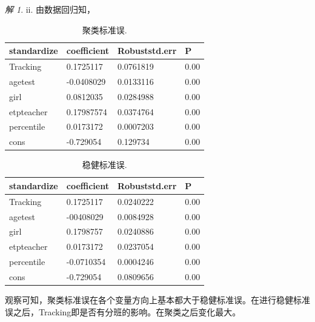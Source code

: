 \documentclass[a4paper]{ctexart}
\theoremstyle{remark}
\newtheorem*{solution}{解}
\begin{document}
\begin{itemize}
\begin{solution}
    ii. 由数据回归知，
    \begin{table}[h]
        \centering
        \begin{threeparttable}%
            \begin{tabular}{llll}%
                \hline
                standardize & coefficient & Robuststd.err & P \\
                \hline
                Tracking &  0.1725117 & 0.0761819  & 0.00 \\
                agetest  &   -0.0408029 & 0.0133116  & 0.00\\
                girl   &  0.0812035  & 0.0284988  & 0.00\\
                etpteacher   &  0.17987574 & 0.0374764    & 0.00\\
                percentile  &  0.0173172 & 0.0007203   & 0.00\\
                cons  &  -0.729054  & 0.129734  & 0.00\\
                \hline
            \end{tabular} 
        \end{threeparttable}
        \caption{\label{font-table} 聚类标准误. }
    \end{table}

    \begin{table}[h]
        \centering
        \begin{threeparttable}%
            \begin{tabular}{llll}%
                \hline
                standardize & coefficient & Robuststd.err & P \\
                \hline
                Tracking &  0.1725117 & 0.0240222  & 0.00 \\
                agetest  &   -00408029 & 0.0084928   & 0.00\\
                girl   &  0.1798757 & 0.0240886  & 0.00\\
                etpteacher   &  0.0173172 & 0.0237054    & 0.00\\
                percentile  &  -0.0710354 & 0.0004246   & 0.00\\
                cons  &  -0.729054  & 0.0809656   & 0.00\\
                \hline
            \end{tabular} 
        \end{threeparttable}
        \caption{\label{font-table} 稳健标准误. }
    \end{table}
    观察可知，聚类标准误在各个变量方向上基本都大于稳健标准误。在进行稳健标准误之后，Tracking即是否有分班的影响。在聚类之后变化最大。




\end{solution}
\end{itemize}
\end{document}
